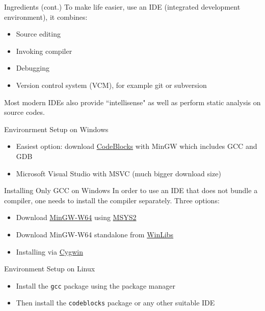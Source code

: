 \documentclass[12pt, aspectratio=169]{beamer}
\begin{document}
    \begin{frame}{Ingredients (cont.)}
        To make life easier, use an IDE (integrated development environment), it combines:
        \begin{itemize}
            \item Source editing
            \item Invoking compiler
            \item Debugging
            \item Version control system (VCM), for example git or subversion
        \end{itemize}

        Most modern IDEs also provide ``intellisense" as well as perform static analysis on source codes.
    \end{frame}

    \begin{frame}{Environrment Setup on Windows}
        \begin{itemize}
            \item Easiest option: download \href{https://www.codeblocks.org/downloads/binaries/}{CodeBlocks} with MinGW which includes GCC and GDB
            \item Microsoft Visual Studio with MSVC (much bigger download size)
        \end{itemize}
    \end{frame}

    \begin{frame}{Installing Only GCC on Windows}
        In order to use an IDE that does not bundle a compiler, one needs to install the compiler separately. Three options:
        \begin{itemize}
            \item Download \href{https://www.mingw-w64.org/}{MinGW-W64} using \href{https://www.msys2.org/}{MSYS2}
            \item Download MinGW-W64 standalone from \href{https://winlibs.com/}{WinLibs}
            \item Installing via \href{https://www.cygwin.com/}{Cygwin}
        \end{itemize}
    \end{frame}

    \begin{frame}{Environment Setup on Linux}
        \begin{itemize}
            \item Install the \texttt{gcc} package using the package manager
            \item Then install the \texttt{codeblocks} package or any other suitable IDE
        \end{itemize}
    \end{frame}
\end{document}

